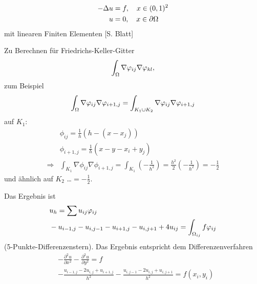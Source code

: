 \begin{beispiel}
  \begin{align*}
    -\Delta u &= f, \quad x \in (0,1)^2\\
u &= 0,  \quad x \in \partial \Omega
  \end{align*}
mit linearen Finiten Elementen [S. Blatt]

Zu Berechnen für Friedrichs-Keller-Gitter
\begin{align*}
  \int_\Omega \nabla \varphi_{ij} \nabla \varphi_{kl},
\end{align*}
zum Beispiel
\begin{align*}
  \int_\Omega \nabla \varphi_{ij} \nabla \varphi_{i+1, j} = \int_{K_1 \cup K_2}\nabla\varphi_{ij} \nabla\varphi_{i+1, j}
\end{align*}
auf $K_1$:
\begin{align*}
&  \phi_{ij} = \frac 1 h (h - (x-x_j))\\
&  \phi_{i+1, j} = \frac 1 h (x-y- x_i + y_j)\\
\Rightarrow  &\int_{K_1}\nabla \phi_{ij} \nabla \phi_{i+1, j} = \int_{K_1}(- \frac 1 {h^2}) =  \frac {h^2} 2 (- \frac 1 {h^2})  =  -\frac 1 2 
\end{align*}
und ähnlich  auf $K_2$ \dots $ = - \frac 1 2 $.

Das Ergebnis ist 
\begin{align*}
&  u_h = \sum u_{ij} \varphi_{ij}\\
&- u_{i-1, j}- u_{i, j-1}- u_{i+1, j}- u_{i, j+1} + 4 u_{ij} = \int_{\Omega_{ij}} f \varphi_{ij}
\end{align*}
(5-Punkte-Differenzenstern). Das Ergebnis entspricht dem Differenzenverfahren
\begin{align*}
&  -\frac {\partial^2 u}{\partial x^2}   -\frac {\partial^2 u}{\partial y^2}  = f\\
&  -\frac {u_{i-1, j}-2u_{i, j} + u_{i+1, j}}{h^2}   -\frac {u_{i, j-1}-2u_{i, j} + u_{i, j+1}}{h^2} = f(x_i, y_i)
\end{align*}
\end{beispiel}
